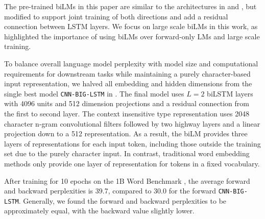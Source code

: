 \documentclass[11pt,a4paper]{article}
\begin{document}
The pre-trained biLMs in this paper are similar to the architectures in \citet{Jzefowicz2016ExploringTL} and \citet{kim2015characterNeuralLM}, but 
modified to support joint training of both directions and add a residual connection between LSTM layers.
We focus on large scale biLMs in this work, as \citet{Peters2017SemisupervisedST} highlighted the importance of using biLMs over forward-only LMs and large scale training.

To balance overall language model perplexity with model size and computational requirements for downstream tasks while maintaining a purely character-based input representation, we halved all embedding and hidden dimensions from the single best model \texttt{CNN-BIG-LSTM} in \citet{Jzefowicz2016ExploringTL}.
The final model uses $L=2$ biLSTM layers with 4096 units and 512 dimension projections and a residual connection from the first to second layer.
The context insensitive type representation uses 2048 character n-gram convolutional filters followed by two highway layers \citep{Srivastava2015TrainingVD} and a linear projection down to a 512 representation.
As a result, the biLM provides three layers of representations for each input token, including those outside the training set due to the purely character input.
In contrast, traditional word embedding methods only provide one layer of representation for tokens in a fixed vocabulary.

After training for 10 epochs on the 1B Word Benchmark \citep{Chelba2014OneBW}, the average forward and backward perplexities is 39.7, compared to 30.0 for the forward \texttt{CNN-BIG-LSTM}.
Generally, we found the forward and backward perplexities to be approximately equal, with the backward value slightly lower.
\end{document}

